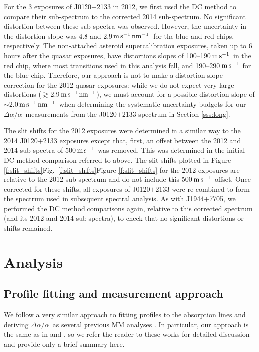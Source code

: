 \documentclass[fleqn,usenatbib,usedcolumn]{mnras}
\renewcommand{\la}{\lesssim} %
\renewcommand{\ga}{\gtrsim} %
\newcommand{\Sref}[1]{Section \ref{#1}}
\newcommand{\Fref}[1]{\ifhmode \ifnum\spacefactor=1001 Figure \ref{#1}\else Fig.\ \ref{#1}\fi \else Figure \ref{#1}\fi}
\newcommand{\ms}{\ensuremath{\textrm{m\,s}^{-1}}}
\newcommand{\daa}{\ensuremath{\Delta\alpha/\alpha}}
\newcommand{\msnm}{\ensuremath{\ms\,\textrm{nm}^{-1}}}
\begin{document}
For the 3 exposures of J0120$+$2133 in 2012, we first used the DC method to compare their sub-spectrum to the corrected 2014 sub-spectrum. No significant distortion between these sub-spectra was observed. However, the uncertainty in the distortion slope was 4.8 and 2.9\,\msnm\ for the blue and red chips, respectively. The non-attached asteroid supercalibration exposures, taken up to 6 hours after the quasar exposures, have distortions slopes of 100--190\,\ms\ in the red chip, where most transitions used in this analysis fall, and 190--290\,\ms\ for the blue chip. Therefore, our approach is not to make a distortion slope correction for the 2012 quasar exposures; while we do not expect very large distortions ($\ga$2.9\,\msnm), we must account for a possible distortion slope of $\sim$2.0\,\msnm\ when determining the systematic uncertainty budgets for our \daa\ measurements from the J0120$+$2133 spectrum in \Sref{sss:long}.

The slit shifts for the 2012 exposures were determined in a similar way to the 2014 J0120$+$2133 exposures except that, first, an offset between the 2012 and 2014 sub-spectra of 500\,\ms\ was removed. This was determined in the initial DC method comparison referred to above. The slit shifts plotted in \Fref{f:slit_shifts} for the 2012 exposures are relative to the 2012 sub-spectrum and do not include this 500\,\ms\ offset. Once corrected for these shifts, all exposures of J0120$+$2133 were re-combined to form the spectrum used in subsequent spectral analysis. As with J1944$+$7705, we performed the DC method comparisons again, relative to this corrected spectrum (and its 2012 and 2014 sub-spectra), to check that no significant distortions or shifts remained.


\section{Analysis}\label{s:analysis}

\subsection{Profile fitting and \boldmath{$\daa$} measurement approach}\label{ss:genfit}

We follow a very similar approach to fitting profiles to the absorption lines and deriving \daa\ as several previous MM analyses \citep[e.g.][]{Murphy:2001:1223,Murphy:2003:609,King:2012:3370,Molaro:2013:A68}. In particular, our approach is the same as in \citet{Evans:2014:128} and \citet{Murphy:2016:2461}, so we refer the reader to these works for detailed discussion and provide only a brief summary here.
\end{document}
